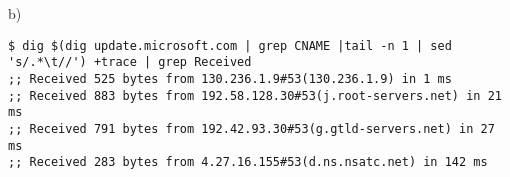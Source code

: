 b)\begin{verbatim}
$ dig $(dig update.microsoft.com | grep CNAME |tail -n 1 | sed 's/.*\t//') +trace | grep Received
;; Received 525 bytes from 130.236.1.9#53(130.236.1.9) in 1 ms
;; Received 883 bytes from 192.58.128.30#53(j.root-servers.net) in 21 ms
;; Received 791 bytes from 192.42.93.30#53(g.gtld-servers.net) in 27 ms
;; Received 283 bytes from 4.27.16.155#53(d.ns.nsatc.net) in 142 ms
\end{verbatim}


